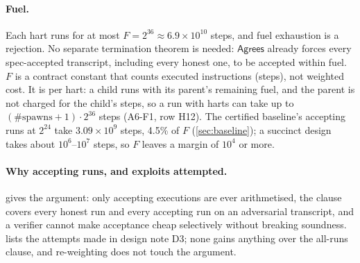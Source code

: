 \label{subsec:cost-u2}%
\paragraph{Fuel.} Each hart runs for at most $F=2^{36}\approx6.9\times10^{10}$ steps, and fuel
exhaustion is a rejection. No separate termination theorem is needed: $\mathsf{Agrees}$ already forces
every spec-accepted transcript, including every honest one, to be accepted within fuel. $F$ is a
contract constant that counts executed instructions (steps), not weighted cost. It is per hart: a
child runs with its parent's remaining fuel, and the parent is not charged for the child's steps, so
a run with harts can take up to $(\#\mathrm{spawns}+1)\cdot2^{36}$ steps (A6-F1, row H12). The certified baseline's
accepting runs at $2^{24}$ take $3.09\times10^9$ steps, 4.5\% of $F$ (\cref{sec:baseline}); a succinct
design takes about $10^{6}$--$10^{7}$ steps, so $F$ leaves a margin of $10^4$ or more.

\paragraph{Why accepting runs, and exploits attempted.}  gives the argument: only
accepting executions are ever arithmetised, the clause covers every honest run and every accepting
run on an adversarial transcript, and a verifier cannot make acceptance cheap selectively without
breaking soundness.  lists the attempts made in design note D3; none
gains anything over the all-runs clause, and re-weighting does not touch the argument.

